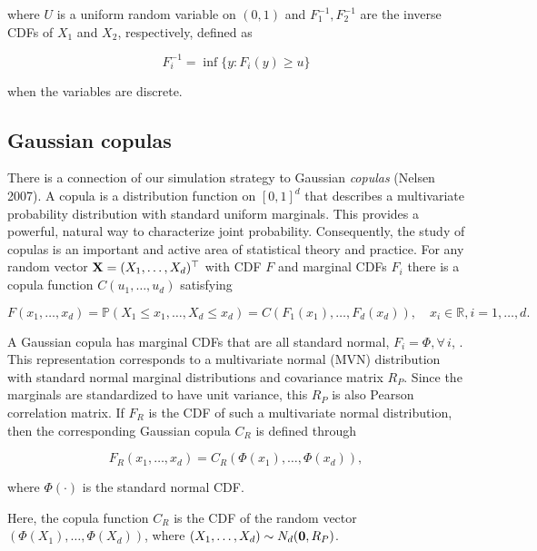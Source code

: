 \documentclass{article}
\begin{document}
\noindent where \(U\) is a uniform random variable on \((0,1)\) and
\(F^{-1}_1, F^{-1}_2\) are the inverse CDFs of \(X_1\) and \(X_2\),
respectively, defined as

\begin{equation}
F_{i}^{-1} = \inf\{y:F_{i}(y) \geq u \}
\label{eq:inverseCDF}
\end{equation}

when the variables are discrete.

\hypertarget{gaussian-copulas}{%
\subsection{Gaussian copulas}\label{gaussian-copulas}}

There is a connection of our simulation strategy to Gaussian
\emph{copulas} (Nelsen 2007). A copula is a distribution function on
\([0,1]^d\) that describes a multivariate probability distribution with
standard uniform marginals. This provides a powerful, natural way to
characterize joint probability. Consequently, the study of copulas is an
important and active area of statistical theory and practice. For any
random vector \({\bf X}=(X_1, \ldots, X_d)^\top\) with CDF \(F\) and
marginal CDFs \(F_i\) there is a copula function \(C(u_1, \ldots, u_d)\)
satisfying

\begin{equation}
F(x_1, \ldots, x_d) = {\mathbb P}(X_1\leq x_1, \ldots,X_d\leq x_d) = C(F_1(x_1), \ldots, F_d(x_d)), \quad x_i \in {\mathbb R}, i=1,\ldots,d.
\label{eq:copula}
\end{equation}

A Gaussian copula has marginal CDFs that are all standard normal,
\(F_i = \Phi, \forall \, i\), . This representation corresponds to a
multivariate normal (MVN) distribution with standard normal marginal
distributions and covariance matrix \(R_P\). Since the marginals are
standardized to have unit variance, this \(R_P\) is also Pearson
correlation matrix. If \(F_R\) is the CDF of such a multivariate normal
distribution, then the corresponding Gaussian copula \(C_R\) is defined
through

\begin{equation}
\label{eq:gauss}
F_R(x_1, \ldots, x_d) = C_R(\Phi(x_1), \ldots, \Phi(x_d)),
\end{equation}

where \(\Phi(\cdot)\) is the standard normal CDF.

Here, the copula function \(C_R\) is the CDF of the random vector
\((\Phi(X_1), \ldots, \Phi(X_d))\), where
\((X_1, \ldots, X_d) \sim N_d({\bf 0}, R_P)\).
\end{document}
